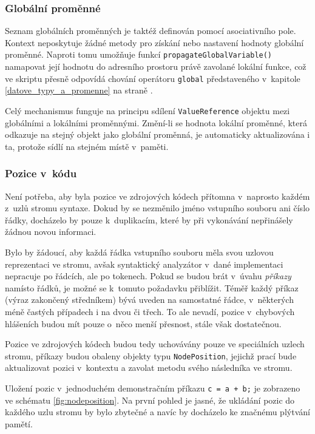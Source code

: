 \documentclass[11pt,twoside,a4paper]{book}
\begin{document}
\subsubsection{Globální proměnné}

Seznam globálních proměnných je taktéž definován pomocí asociativního pole. Kontext neposkytuje žádné metody pro získání nebo nastavení hodnoty globální proměnné. Naproti tomu umožňuje funkcí \texttt{propagateGlobalVariable()} namapovat její hodnotu do adresního prostoru právě zavolané lokální funkce, což ve skriptu přesně odpovídá chování operátoru \texttt{global} představeného v~kapitole \ref{datove_typy_a_promenne} na straně \pageref{datove_typy_a_promenne}.

Celý mechanismus funguje na principu sdílení \texttt{ValueReference} objektu mezi globálními a lo\-kál\-ní\-mi proměnnými. Změní-li se hodnota lokální proměnné, která odkazuje na stejný objekt jako globální proměnná, je automaticky aktualizována i ta, protože sídlí na stejném místě v~paměti.


\subsubsection{Pozice v~kódu}
\label{pozice_v_kodu}

Není potřeba, aby byla pozice ve zdrojových kódech přítomna v~naprosto každém z~uzlů stromu syntaxe. Dokud by se nezměnilo jméno vstupního souboru ani číslo řádky, docházelo by pouze k~duplikacím, které by při vykonávání nepřinášely žádnou novou informaci.

Bylo by žádoucí, aby každá řádka vstupního souboru měla svou uzlovou reprezentaci ve stromu, avšak syntaktický analyzátor v~dané implementaci nepracuje po řádcích, ale po tokenech. Pokud se budou brát v~úvahu \textit{příkazy} namísto řádků, je možné se k~tomuto požadavku přiblížit. Téměř každý příkaz (výraz zakončený středníkem) bývá uveden na samostatné řádce, v~některých méně častých případech i na dvou či třech. To ale nevadí, pozice v~chybových hlášeních budou mít pouze o~něco menší přesnost, stále však dostatečnou.

Pozice ve zdrojových kódech budou tedy uchovávány pouze ve speciálních uzlech stromu, příkazy budou obaleny objekty typu \texttt{NodePosition}, jejichž prací bude aktualizovat pozici v~kontextu a zavolat metodu svého ná\-sled\-ní\-ka ve stromu.

Uložení pozic v~jednoduchém demonstračním příkazu \texttt{c = a + b;} je zobrazeno ve schématu \ref{fig:nodeposition}. Na první pohled je jasné, že ukládání pozic do každého uzlu stromu by bylo zbytečné a navíc by docházelo ke značnému plýtvání pamětí.
\end{document}

